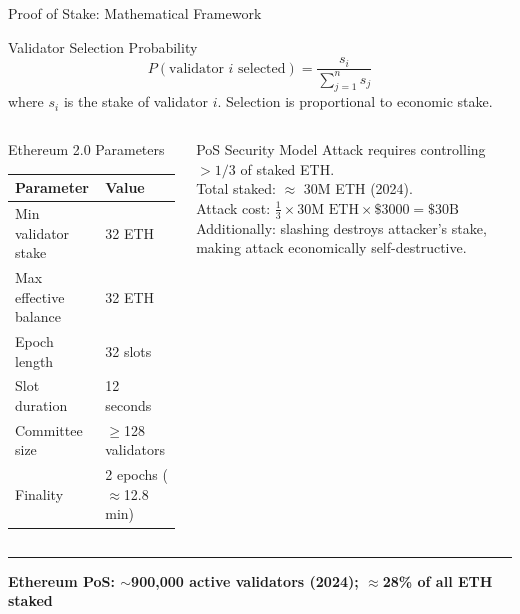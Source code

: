 \documentclass[8pt,aspectratio=169]{beamer}
\newcommand{\bottomnote}[1]{\vfill\vspace{-2mm}\textcolor{mllavender2}{\rule{\textwidth}{0.4pt}}\vspace{1mm}\footnotesize\textbf{#1}}
\begin{document}
\begin{frame}{Proof of Stake: Mathematical Framework}
\begin{block}{Validator Selection Probability}
\[P(\text{validator } i \text{ selected}) = \frac{s_i}{\sum_{j=1}^{n} s_j}\]
where $s_i$ is the stake of validator $i$. Selection is proportional to economic stake.
\end{block}
\vspace{2mm}
\begin{columns}
\begin{block}{Ethereum 2.0 Parameters}
\begin{tabular}{ll}
\toprule
\textbf{Parameter} & \textbf{Value}\\
\midrule
Min validator stake & 32 ETH\\
Max effective balance & 32 ETH\\
Epoch length & 32 slots\\
Slot duration & 12 seconds\\
Committee size & $\geq$128 validators\\
Finality & 2 epochs ($\approx$12.8 min)\\
\bottomrule
\end{tabular}
\end{block}
\begin{block}{PoS Security Model}
Attack requires controlling $>1/3$ of staked ETH.\\[4pt]
Total staked: $\approx$ 30M ETH (2024).\\
Attack cost: $\frac{1}{3}\times 30\text{M ETH}\times\$3000 = \$30\text{B}$\\[4pt]
Additionally: slashing destroys attacker's stake, making attack economically self-destructive.
\end{block}
\end{columns}
\bottomnote{Ethereum PoS: $\sim$900,000 active validators (2024); $\approx$28\% of all ETH staked}
\end{frame}
\end{document}

